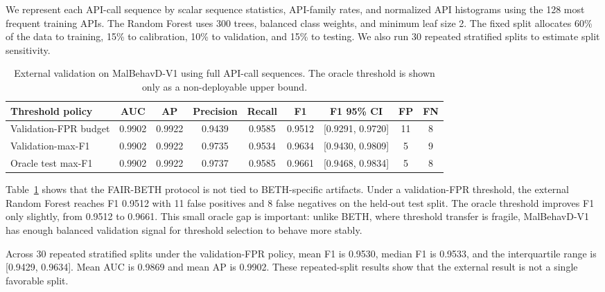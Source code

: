 \documentclass[10pt,journal,compsoc]{IEEEtran}
\begin{document}
We represent each API-call sequence by scalar sequence statistics, API-family rates, and normalized API histograms using the 128 most frequent training APIs. The Random Forest uses 300 trees, balanced class weights, and minimum leaf size 2. The fixed split allocates 60\% of the data to training, 15\% to calibration, 10\% to validation, and 15\% to testing. We also run 30 repeated stratified splits to estimate split sensitivity.

\begin{table}[t]
\centering
\caption{External validation on MalBehavD-V1 using full API-call sequences. The oracle threshold is shown only as a non-deployable upper bound.}
\label{tab:malbehavd_external}
\begin{tabular}{lcccccccc}
\toprule
\textbf{Threshold policy} & \textbf{AUC} & \textbf{AP} & \textbf{Precision} & \textbf{Recall} & \textbf{F1} & \textbf{F1 95\% CI} & \textbf{FP} & \textbf{FN} \\
\midrule
Validation-FPR budget & 0.9902 & 0.9922 & 0.9439 & 0.9585 & 0.9512 & [0.9291, 0.9720] & 11 & 8 \\
Validation-max-F1 & 0.9902 & 0.9922 & 0.9735 & 0.9534 & 0.9634 & [0.9430, 0.9809] & 5 & 9 \\
Oracle test max-F1 & 0.9902 & 0.9922 & 0.9737 & 0.9585 & 0.9661 & [0.9468, 0.9834] & 5 & 8 \\
\bottomrule
\end{tabular}
\end{table}

Table~\ref{tab:malbehavd_external} shows that the FAIR-BETH protocol is not tied to BETH-specific artifacts. Under a validation-FPR threshold, the external Random Forest reaches F1 0.9512 with 11 false positives and 8 false negatives on the held-out test split. The oracle threshold improves F1 only slightly, from 0.9512 to 0.9661. This small oracle gap is important: unlike BETH, where threshold transfer is fragile, MalBehavD-V1 has enough balanced validation signal for threshold selection to behave more stably.

Across 30 repeated stratified splits under the validation-FPR policy, mean F1 is 0.9530, median F1 is 0.9533, and the interquartile range is [0.9429, 0.9634]. Mean AUC is 0.9869 and mean AP is 0.9902. These repeated-split results show that the external result is not a single favorable split.
\end{document}
